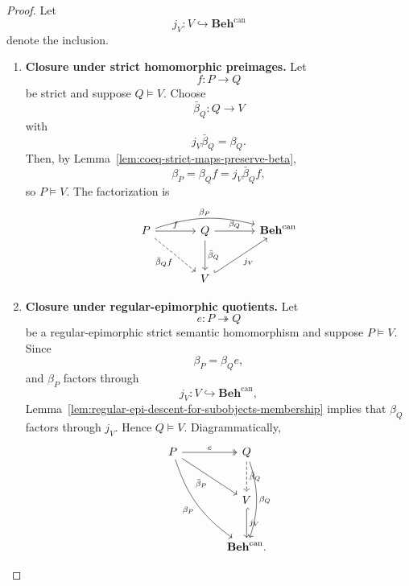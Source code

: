 \begin{proof}
    Let
    \[
        j_V:V\hookrightarrow\mathbf{Beh}^{\mathrm{can}}
    \]
    denote the inclusion.

    \begin{enumerate}
        \item \textbf{Closure under strict homomorphic preimages.}
        Let
        \[
            f:P\to Q
        \]
        be strict and suppose \(Q\models V\). Choose
        \[
            \bar\beta_Q:Q\to V
        \]
        with
        \[
            j_V\bar\beta_Q=\beta_Q.
        \]
        Then, by Lemma~\ref{lem:coeq-strict-maps-preserve-beta},
        \[
            \beta_P=\beta_Qf=j_V\bar\beta_Qf,
        \]
        so \(P\models V\). The factorization is
        \[
        \begin{tikzcd}[column sep=large, row sep=large]
            P
                \arrow[r, "f"]
                \arrow[rr, bend left=16, "\beta_P"]
                \arrow[dr, dashed, "\bar\beta_Qf"']
            &
            Q
                \arrow[r, "\beta_Q"]
                \arrow[d, "\bar\beta_Q"]
            &
            \mathbf{Beh}^{\mathrm{can}}
            \\
            &
            V
                \arrow[ur, hook, "j_V"']
            &
        \end{tikzcd}
        \]

        \item \textbf{Closure under regular-epimorphic quotients.}
        Let
        \[
            e:P\twoheadrightarrow Q
        \]
        be a regular-epimorphic strict semantic homomorphism and suppose
        \(P\models V\). Since
        \[
            \beta_P=\beta_Qe,
        \]
        and \(\beta_P\) factors through
        \[
            j_V:V\hookrightarrow\mathbf{Beh}^{\mathrm{can}},
        \]
        Lemma~\ref{lem:regular-epi-descent-for-subobjects-membership} implies that
        \(\beta_Q\) factors through \(j_V\). Hence \(Q\models V\).
        Diagrammatically,
        \[
        \begin{tikzcd}[column sep=large, row sep=large]
            P
                \arrow[r, two heads, "e"]
                \arrow[dr, "\bar\beta_P"']
                \arrow[ddr, "\beta_P"', bend right=18]
            &
            Q
                \arrow[d, dashed, "\bar\beta_Q"]
                \arrow[dd, "\beta_Q", bend left=18]
            \\
            &
            V
                \arrow[d, hook, "j_V"]
            \\
            &
            \mathbf{Beh}^{\mathrm{can}} .
        \end{tikzcd}
        \]


\end{enumerate}
\end{proof}
